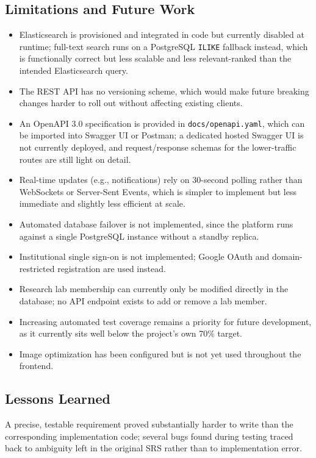 \documentclass[12pt]{article}
\begin{document}
\subsection{Limitations and Future Work}
\begin{itemize}[leftmargin=1.4em]
\item Elasticsearch is provisioned and integrated in code but currently disabled at runtime; full-text search runs on a PostgreSQL \texttt{ILIKE} fallback instead, which is functionally correct but less scalable and less relevant-ranked than the intended Elasticsearch query.
\item The REST API has no versioning scheme, which would make future breaking changes harder to roll out without affecting existing clients.
\item An OpenAPI 3.0 specification is provided in \texttt{docs/openapi.yaml}, which can be imported into Swagger UI or Postman; a dedicated hosted Swagger UI is not currently deployed, and request/response schemas for the lower-traffic routes are still light on detail.
\item Real-time updates (e.g., notifications) rely on 30-second polling rather than WebSockets or Server-Sent Events, which is simpler to implement but less immediate and slightly less efficient at scale.
\item Automated database failover is not implemented, since the platform runs against a single PostgreSQL instance without a standby replica.
\item Institutional single sign-on is not implemented; Google OAuth and domain-restricted registration are used instead.
\item Research lab membership can currently only be modified directly in the database; no API endpoint exists to add or remove a lab member.
\item Increasing automated test coverage remains a priority for future development, as it currently sits well below the project's own 70\% target.
\item Image optimization has been configured but is not yet used throughout the frontend.
\end{itemize}

\subsection{Lessons Learned}
A precise, testable requirement proved substantially harder to write than the corresponding implementation code; several bugs found during testing traced back to ambiguity left in the original SRS rather than to implementation error.
\end{document}
